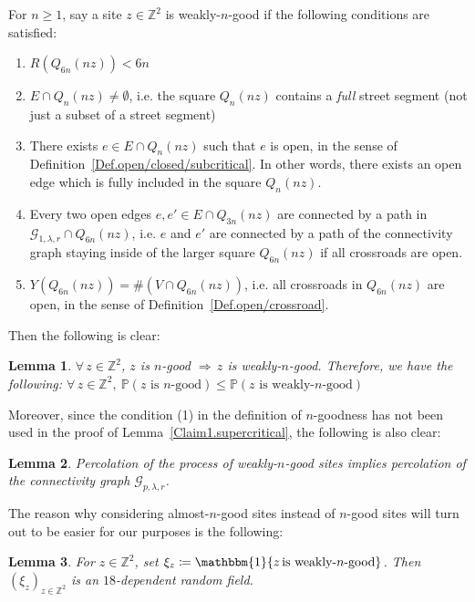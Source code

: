 \documentclass[10pt,a4paper]{amsart}
\theoremstyle{exampstyle}
\newtheorem{Lemma}{Lemma}
\theoremstyle{exampnotations}
\begin{document}
For $n \geq 1$, say a site $z \in \mathbb{Z}^{2}$ is weakly-$n$-good if the following conditions are satisfied:
\begin{enumerate}
\item[$\widetilde{(1)}$] $R(Q_{6n}(nz)) < 6n$
\item[(2)]  $E \cap Q_n(nz) \neq \emptyset$, i.e. the square $Q_n(nz)$ contains a \emph{full} street segment (not just a subset of a street segment)
\item[(3)]  There exists $e \in E \cap Q_n(nz)$ such that $e$ is open, in the sense of Definition~\ref{Def.open/closed/subcritical}. In other words, there exists an open edge which is fully included in the square $Q_n(nz)$.
\item[(4)]  Every two open edges $e,e' \in E \cap Q_{3n}(nz)$ are connected by a path in $\mathcal{G}_{1,\lambda,r}\cap Q_{6n}(nz)$, i.e. $e$ and $e'$ are connected by a path of the connectivity graph staying inside of the larger square $Q_{6n}(nz)$ if all crossroads are open.
\item[(5)]  $Y(Q_{6n}(nz)) = \#(V \cap Q_{6n}(nz))$, i.e. all crossroads in $Q_{6n}(nz)$ are open, in the sense of Definition~\ref{Def.open/crossroad}.
\end{enumerate}
Then the following is clear:
\begin{Lemma}
\label{Lemma1.almost}
$\forall \, z \in \mathbb{Z}^{2}$, $z$ is $n$-good $\Rightarrow \, z$ is weakly-$n$-good. Therefore, we have the following: $\forall \, z \in \mathbb{Z}^{2}, \: \mathbb{P}(\text{$z$ is $n$-good}) \leq \mathbb{P}(\text{$z$ is weakly-$n$-good})$
\end{Lemma} Moreover, since the condition (1) in the definition of $n$-goodness has not been used in the proof of Lemma~\ref{Claim1.supercritical}, the following is also clear:
\begin{Lemma}
\label{Lemma2.almost}
Percolation of the process of weakly-$n$-good sites implies percolation of the connectivity graph $\mathcal{G}_{p,\lambda,r}$.
\end{Lemma}
The reason why considering almost-$n$-good sites instead of $n$-good sites will turn out to be easier for our purposes is the following:
\begin{Lemma}
\label{Claim2.supercritical}
For $z \in \mathbb{Z}^{2}$, set $\xi_{z} \coloneqq \mathbbm{1}\lbrace z \, \text{is weakly-$n$-good} \rbrace$. Then $(\xi_{z})_{z \in \mathbb{Z}^{2}}$ is an $18$-dependent random field.
\end{Lemma}
\end{document}
